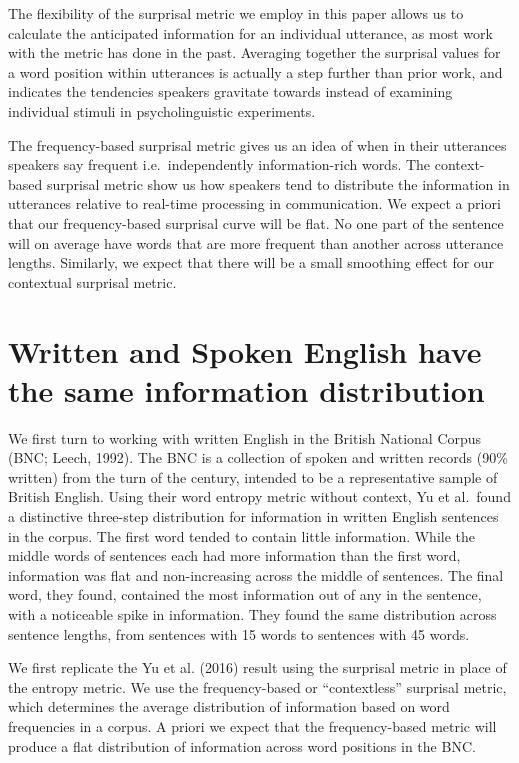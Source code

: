 \documentclass[man,floatsintext]{apa6}
\begin{document}
The flexibility of the surprisal metric we employ in this paper allows us to calculate the anticipated information for an individual utterance, as most work with the metric has done in the past. Averaging together the surprisal values for a word position within utterances is actually a step further than prior work, and indicates the tendencies speakers gravitate towards instead of examining individual stimuli in psycholinguistic experiments.

The frequency-based surprisal metric gives us an idea of when in their utterances speakers say frequent i.e.~independently information-rich words. The context-based surprisal metric show us how speakers tend to distribute the information in utterances relative to real-time processing in communication. We expect a priori that our frequency-based surprisal curve will be flat. No one part of the sentence will on average have words that are more frequent than another across utterance lengths. Similarly, we expect that there will be a small smoothing effect for our contextual surprisal metric.

\hypertarget{written-and-spoken-english-have-the-same-information-distribution}{%
\section{Written and Spoken English have the same information distribution}\label{written-and-spoken-english-have-the-same-information-distribution}}

We first turn to working with written English in the British National Corpus (BNC; Leech, 1992). The BNC is a collection of spoken and written records (90\% written) from the turn of the century, intended to be a representative sample of British English. Using their word entropy metric without context, Yu et al.~found a distinctive three-step distribution for information in written English sentences in the corpus. The first word tended to contain little information. While the middle words of sentences each had more information than the first word, information was flat and non-increasing across the middle of sentences. The final word, they found, contained the most information out of any in the sentence, with a noticeable spike in information. They found the same distribution across sentence lengths, from sentences with 15 words to sentences with 45 words.

We first replicate the Yu et al. (2016) result using the surprisal metric in place of the entropy metric. We use the frequency-based or \enquote{contextless} surprisal metric, which determines the average distribution of information based on word frequencies in a corpus. A priori we expect that the frequency-based metric will produce a flat distribution of information across word positions in the BNC.
\end{document}
